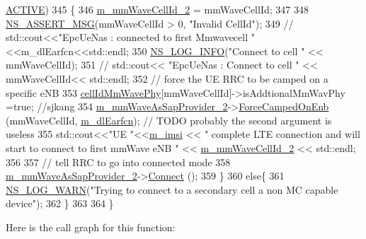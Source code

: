 \begin{DoxyCode}
      \hyperlink{classns3_1_1EpcUeNas_a8047255fecfac11c9e1abe6f13d527dcaf80ef9922299d94e3623f0746cb478cc}{ACTIVE})
345   \{
346           \hyperlink{classns3_1_1EpcUeNas_a26d12e86dd0cb5f87d92d57b6012176c}{m\_mmWaveCellId\_2} = mmWaveCellId;
347 
348           \hyperlink{assert_8h_aff5ece9066c74e681e74999856f08539}{NS\_ASSERT\_MSG}(mmWaveCellId > 0, \textcolor{stringliteral}{"Invalid CellId"});
349          \textcolor{comment}{//   std::cout<<"EpcUeNas : connected to first Mmwavecell " <<m\_dlEarfcn<<std::endl;}
350             \hyperlink{group__logging_gafbd73ee2cf9f26b319f49086d8e860fb}{NS\_LOG\_INFO}(\textcolor{stringliteral}{"Connect to cell "} << mmWaveCellId);
351            \textcolor{comment}{// std::cout<< "EpcUeNas : Connect to cell " << mmWaveCellId<< std::endl;}
352             \textcolor{comment}{// force the UE RRC to be camped on a specific eNB}
353            \hyperlink{classns3_1_1EpcUeNas_aea90c088e28cdee40e99e9bc6ef690f2}{cellIdMmWavePhy}[mmWaveCellId]->isAddtionalMmWavPhy =\textcolor{keyword}{true}; \textcolor{comment}{//sjkang}
354             \hyperlink{classns3_1_1EpcUeNas_a7abf79dbedc37b67f8fae923e1a89604}{m\_mmWaveAsSapProvider\_2}->\hyperlink{classns3_1_1LteAsSapProvider_ac9b1946e31e8ad613ed1c3c845d7af9b}{ForceCampedOnEnb} (mmWaveCellId,
       \hyperlink{classns3_1_1EpcUeNas_a4c7c7d17d9ac2bc5481f367a218d7d33}{m\_dlEarfcn}); \textcolor{comment}{// TODO probably the second argument is useless}
355             std::cout<<\textcolor{stringliteral}{"UE "}<<\hyperlink{classns3_1_1EpcUeNas_a0d541bfcaf7775052a7889bbd706fe02}{m\_imsi} << \textcolor{stringliteral}{" complete LTE connection and  will start to connect to first
       mmWave eNB "} << \hyperlink{classns3_1_1EpcUeNas_a26d12e86dd0cb5f87d92d57b6012176c}{m\_mmWaveCellId\_2} << std::endl;
356 
357             \textcolor{comment}{// tell RRC to go into connected mode}
358             \hyperlink{classns3_1_1EpcUeNas_a7abf79dbedc37b67f8fae923e1a89604}{m\_mmWaveAsSapProvider\_2}->\hyperlink{classns3_1_1LteAsSapProvider_aaaa9d78bc191b89ba8afa323baca67b0}{Connect} ();
359   \}
360   \textcolor{keywordflow}{else}\{
361     \hyperlink{group__logging_gade7208b4009cdf0e25783cd26766f559}{NS\_LOG\_WARN}(\textcolor{stringliteral}{"Trying to connect to a secondary cell a non MC capable device"});
362   \}
363   
364 \}
\end{DoxyCode}


Here is the call graph for this function\+:



